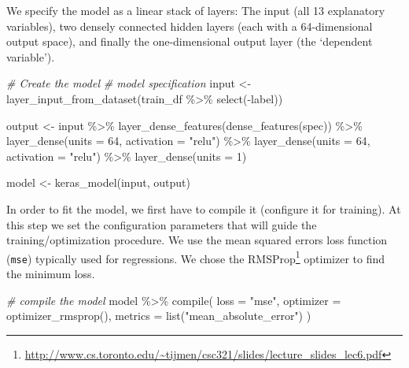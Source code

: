 \documentclass[
  12pt,
]{style/krantz}
\newenvironment{Shaded}{\begin{snugshade}}{\end{snugshade}}
\newcommand{\AttributeTok}[1]{\textcolor[rgb]{0.77,0.63,0.00}{#1}}
\newcommand{\CommentTok}[1]{\textcolor[rgb]{0.56,0.35,0.01}{\textit{#1}}}
\newcommand{\DecValTok}[1]{\textcolor[rgb]{0.00,0.00,0.81}{#1}}
\newcommand{\FunctionTok}[1]{\textcolor[rgb]{0.00,0.00,0.00}{#1}}
\newcommand{\NormalTok}[1]{#1}
\newcommand{\OtherTok}[1]{\textcolor[rgb]{0.56,0.35,0.01}{#1}}
\newcommand{\SpecialCharTok}[1]{\textcolor[rgb]{0.00,0.00,0.00}{#1}}
\newcommand{\StringTok}[1]{\textcolor[rgb]{0.31,0.60,0.02}{#1}}
\renewcommand{\href}[2]{#2\footnote{\url{#1}}}
\begin{document}
We specify the model as a linear stack of layers: The input (all 13 explanatory variables), two densely connected hidden layers (each with a 64-dimensional output space), and finally the one-dimensional output layer (the `dependent variable').

\begin{Shaded}
\begin{Highlighting}[]
\CommentTok{\# Create the model}
\CommentTok{\# model specification}
\NormalTok{input }\OtherTok{\textless{}{-}} \FunctionTok{layer\_input\_from\_dataset}\NormalTok{(train\_df }\SpecialCharTok{\%\textgreater{}\%} \FunctionTok{select}\NormalTok{(}\SpecialCharTok{{-}}\NormalTok{label))}

\NormalTok{output }\OtherTok{\textless{}{-}}\NormalTok{ input }\SpecialCharTok{\%\textgreater{}\%} 
  \FunctionTok{layer\_dense\_features}\NormalTok{(}\FunctionTok{dense\_features}\NormalTok{(spec)) }\SpecialCharTok{\%\textgreater{}\%} 
  \FunctionTok{layer\_dense}\NormalTok{(}\AttributeTok{units =} \DecValTok{64}\NormalTok{, }\AttributeTok{activation =} \StringTok{"relu"}\NormalTok{) }\SpecialCharTok{\%\textgreater{}\%}
  \FunctionTok{layer\_dense}\NormalTok{(}\AttributeTok{units =} \DecValTok{64}\NormalTok{, }\AttributeTok{activation =} \StringTok{"relu"}\NormalTok{) }\SpecialCharTok{\%\textgreater{}\%}
  \FunctionTok{layer\_dense}\NormalTok{(}\AttributeTok{units =} \DecValTok{1}\NormalTok{) }

\NormalTok{model }\OtherTok{\textless{}{-}} \FunctionTok{keras\_model}\NormalTok{(input, output)}
\end{Highlighting}
\end{Shaded}

In order to fit the model, we first have to compile it (configure it for training). At this step we set the configuration parameters that will guide the training/optimization procedure. We use the mean squared errors loss function (\texttt{mse}) typically used for regressions. We chose the \href{http://www.cs.toronto.edu/~tijmen/csc321/slides/lecture_slides_lec6.pdf}{RMSProp} optimizer to find the minimum loss.

\begin{Shaded}
\begin{Highlighting}[]
\CommentTok{\# compile the model  }
\NormalTok{model }\SpecialCharTok{\%\textgreater{}\%} 
  \FunctionTok{compile}\NormalTok{(}
    \AttributeTok{loss =} \StringTok{"mse"}\NormalTok{,}
    \AttributeTok{optimizer =} \FunctionTok{optimizer\_rmsprop}\NormalTok{(),}
    \AttributeTok{metrics =} \FunctionTok{list}\NormalTok{(}\StringTok{"mean\_absolute\_error"}\NormalTok{)}
\NormalTok{  )}
\end{Highlighting}
\end{Shaded}
\end{document}
